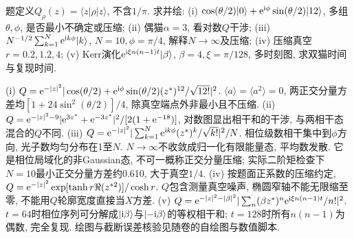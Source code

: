 \begin{exercise}题定义$Q_\rho(z)=\langle z|\rho|z\rangle$, 不含$1/\pi$. 求并绘: (i) $\cos(\theta/2)\lvert 0\rangle+\mathrm e^{\mathrm i\phi}\sin(\theta/2)\lvert 12\rangle$, 多组$\theta,\phi$, 是否最小不确定或压缩; (ii) 偶猫$\alpha=3$, 看对数$Q$干涉; (iii) $N^{-1/2}\sum_{k=1}^N\mathrm e^{\mathrm i k\phi}\lvert k\rangle$, $N=10,\phi=\pi/4$, 解释$N\to\infty$及压缩; (iv) 压缩真空$r=0.2,1.2,4$; (v) Kerr演化$\mathrm e^{\mathrm i\xi n(n-1)t}\lvert \beta\rangle$, $\beta=4,\xi=\pi/128$, 多时刻图, 求双猫时间与复现时间.\end{exercise}
\begin{solution}(i) $Q=\mathrm e^{-|z|^2}|\cos(\theta/2)+\mathrm e^{\mathrm i\phi}\sin(\theta/2)(z^*)^{12}/\sqrt{12!}|^2$. $\langle a\rangle=\langle a^2\rangle=0$, 两正交分量方差均$[1+24\sin^2(\theta/2)]/4$, 除真空端点外非最小且不压缩. (ii) $Q=\mathrm e^{-|z|^2-9}|\mathrm e^{3z^*}+\mathrm e^{-3z^*}|^2/[2(1+\mathrm e^{-18})]$, 对数图显出相干和的干涉, 与两相干态混合的$Q$不同. (iii) $Q=\mathrm e^{-|z|^2}|\sum_{k=1}^N\mathrm e^{\mathrm i k\phi}(z^*)^k/\sqrt{k!}|^2/N$. 相位级数相干集中到$\phi$方向, 光子数均匀分布在1至$N$. $N\to\infty$不收敛成归一化有限能量态, 平均数发散. 它是相位局域化的非Gaussian态, 不可一概称正交分量压缩; 实际二阶矩检查下$N=10$最小正交分量方差约0.610, 大于真空$1/4$. (iv) 按题面正系数的压缩约定,$Q=\mathrm e^{-|z|^2}\exp[\tanh r\Re(z^{*2})]/\cosh r$. $Q$包含测量真空噪声, 椭圆窄轴不能无限缩至零, 不能用$Q$轮廓宽度直接当$X$方差. (v) $Q=\mathrm e^{-|z|^2-|\beta|^2}|\sum_n(\beta z^*)^n\mathrm e^{\mathrm i\xi n(n-1)t}/n!|^2$. $t=64$时相位序列可分解成$\lvert \mathrm i\beta\rangle$与$\lvert -\mathrm i\beta\rangle$的等权相干和; $t=128$时所有$n(n-1)$为偶数, 完全复现. 绘图与截断误差核验见随卷的自绘图与数值脚本.
\end{solution}

